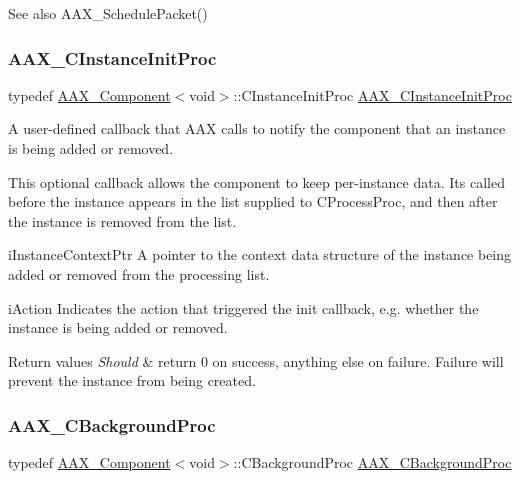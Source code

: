 \begin{DoxySeeAlso}{See also}
A\+A\+X\+\_\+\+Schedule\+Packet() 
\end{DoxySeeAlso}
\mbox{\label{a00401_a3963a850079d3186e08c97a1a4d0ef1c}} 
\subsubsection{\texorpdfstring{AAX\_CInstanceInitProc}{AAX\_CInstanceInitProc}}
{\footnotesize\ttfamily typedef \mbox{\hyperlink{a01437}{A\+A\+X\+\_\+\+Component}}$<$void$>$\+::C\+Instance\+Init\+Proc \mbox{\hyperlink{a00401_a3963a850079d3186e08c97a1a4d0ef1c}{A\+A\+X\+\_\+\+C\+Instance\+Init\+Proc}}}



A user-\/defined callback that A\+AX calls to notify the component that an instance is being added or removed. 

This optional callback allows the component to keep per-\/instance data. It\textquotesingle{}s called before the instance appears in the list supplied to C\+Process\+Proc, and then after the instance is removed from the list.

\begin{DoxyParagraph}{i\+Instance\+Context\+Ptr}
A pointer to the context data structure of the instance being added or removed from the processing list.
\end{DoxyParagraph}
\begin{DoxyParagraph}{i\+Action}
Indicates the action that triggered the init callback, e.\+g. whether the instance is being added or removed.
\end{DoxyParagraph}

\begin{DoxyRetVals}{Return values}
{\em Should} & return 0 on success, anything else on failure. Failure will prevent the instance from being created. \\
\hline
\end{DoxyRetVals}
\mbox{\label{a00401_aa64561d963284a3124a0821e7dc79c9a}} 
\subsubsection{\texorpdfstring{AAX\_CBackgroundProc}{AAX\_CBackgroundProc}}
{\footnotesize\ttfamily typedef \mbox{\hyperlink{a01437}{A\+A\+X\+\_\+\+Component}}$<$void$>$\+::C\+Background\+Proc \mbox{\hyperlink{a00401_aa64561d963284a3124a0821e7dc79c9a}{A\+A\+X\+\_\+\+C\+Background\+Proc}}}



